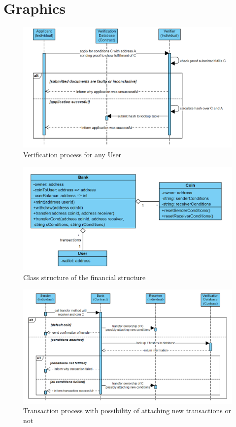 \chapter{Graphics}
\begin{figure}[H]
    \centering
    \includegraphics[scale=0.55]{figures/verification.PNG}  
    \caption{Verification process for any User}
    \label{fig:my_label}
\end{figure}
\begin{figure}[H]
    \centering
    \includegraphics[scale=0.55]{figures/financeUML.PNG}  
    \caption{Class structure of the financial structure}
    \label{fig:my_label}
\end{figure}
\begin{figure}[H]
    \centering
    \includegraphics[scale=0.55]{figures/transfer.PNG}  
    \caption{Transaction process with possibility of attaching new transactions or not}
    \label{fig:my_label}
\end{figure}
